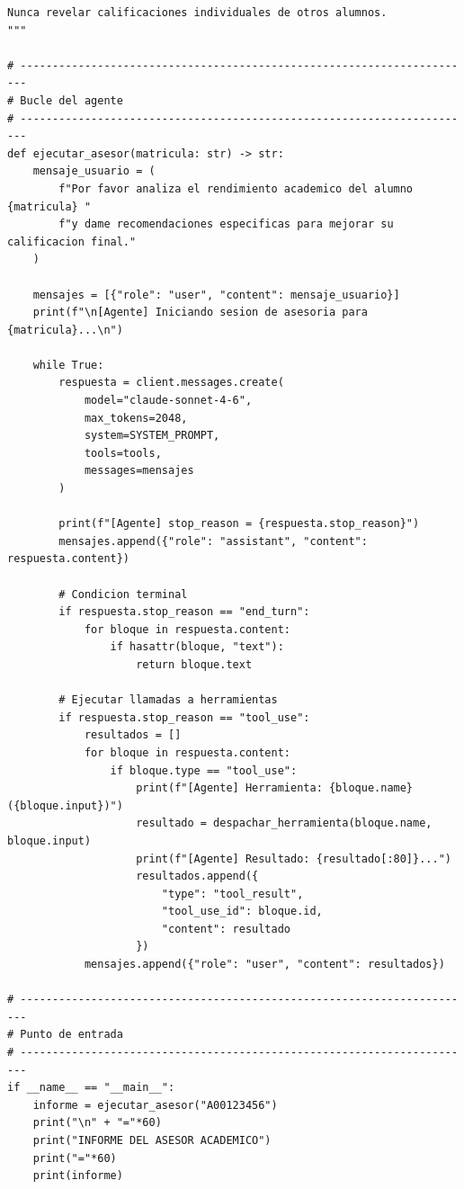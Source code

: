 \documentclass[11pt,letterpaper]{article}
\begin{document}
\begin{lstlisting}[style=PythonStyle, caption={Agente asesor académico completo}, label={lst:grade-agent}]
Nunca revelar calificaciones individuales de otros alumnos.
"""

# -----------------------------------------------------------------------
# Bucle del agente
# -----------------------------------------------------------------------
def ejecutar_asesor(matricula: str) -> str:
    mensaje_usuario = (
        f"Por favor analiza el rendimiento academico del alumno {matricula} "
        f"y dame recomendaciones especificas para mejorar su calificacion final."
    )

    mensajes = [{"role": "user", "content": mensaje_usuario}]
    print(f"\n[Agente] Iniciando sesion de asesoria para {matricula}...\n")

    while True:
        respuesta = client.messages.create(
            model="claude-sonnet-4-6",
            max_tokens=2048,
            system=SYSTEM_PROMPT,
            tools=tools,
            messages=mensajes
        )

        print(f"[Agente] stop_reason = {respuesta.stop_reason}")
        mensajes.append({"role": "assistant", "content": respuesta.content})

        # Condicion terminal
        if respuesta.stop_reason == "end_turn":
            for bloque in respuesta.content:
                if hasattr(bloque, "text"):
                    return bloque.text

        # Ejecutar llamadas a herramientas
        if respuesta.stop_reason == "tool_use":
            resultados = []
            for bloque in respuesta.content:
                if bloque.type == "tool_use":
                    print(f"[Agente] Herramienta: {bloque.name}({bloque.input})")
                    resultado = despachar_herramienta(bloque.name, bloque.input)
                    print(f"[Agente] Resultado: {resultado[:80]}...")
                    resultados.append({
                        "type": "tool_result",
                        "tool_use_id": bloque.id,
                        "content": resultado
                    })
            mensajes.append({"role": "user", "content": resultados})

# -----------------------------------------------------------------------
# Punto de entrada
# -----------------------------------------------------------------------
if __name__ == "__main__":
    informe = ejecutar_asesor("A00123456")
    print("\n" + "="*60)
    print("INFORME DEL ASESOR ACADEMICO")
    print("="*60)
    print(informe)
\end{lstlisting}
\end{document}
